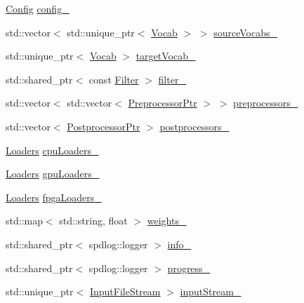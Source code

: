 \begin{DoxyCompactItemize}
\item 
\hyperlink{classamunmt_1_1Config}{Config} \hyperlink{classamunmt_1_1God_a5a0f3720bd8f1f19b7e50206e123f0e9}{config\+\_\+}
\item 
std\+::vector$<$ std\+::unique\+\_\+ptr$<$ \hyperlink{classamunmt_1_1Vocab}{Vocab} $>$ $>$ \hyperlink{classamunmt_1_1God_acb283c7cf822e3efed96a938695c1ac0}{source\+Vocabs\+\_\+}
\item 
std\+::unique\+\_\+ptr$<$ \hyperlink{classamunmt_1_1Vocab}{Vocab} $>$ \hyperlink{classamunmt_1_1God_a38957553a6fc282c0487c4d2d9a02f90}{target\+Vocab\+\_\+}
\item 
std\+::shared\+\_\+ptr$<$ const \hyperlink{classamunmt_1_1Filter}{Filter} $>$ \hyperlink{classamunmt_1_1God_aae4d25701c8177302ea6f07daff690c5}{filter\+\_\+}
\item 
std\+::vector$<$ std\+::vector$<$ \hyperlink{namespaceamunmt_a01f8e038a68167c344d9e40146064712}{Preprocessor\+Ptr} $>$ $>$ \hyperlink{classamunmt_1_1God_a609e290d29732005f6ce09a1e8c3a698}{preprocessors\+\_\+}
\item 
std\+::vector$<$ \hyperlink{namespaceamunmt_a93da118427da6be237f0407643816798}{Postprocessor\+Ptr} $>$ \hyperlink{classamunmt_1_1God_aef3af265dadb03728481dda039df6e26}{postprocessors\+\_\+}
\item 
\hyperlink{classamunmt_1_1God_abe005048d71d1ac78750395d4ac8a531}{Loaders} \hyperlink{classamunmt_1_1God_aa18f86519617baf112214a7564a7bae0}{cpu\+Loaders\+\_\+}
\item 
\hyperlink{classamunmt_1_1God_abe005048d71d1ac78750395d4ac8a531}{Loaders} \hyperlink{classamunmt_1_1God_a2a713e550f5ee7296e7a66bd0b98339d}{gpu\+Loaders\+\_\+}
\item 
\hyperlink{classamunmt_1_1God_abe005048d71d1ac78750395d4ac8a531}{Loaders} \hyperlink{classamunmt_1_1God_a59b113c68d8b05dfd18b8a48ed9fa180}{fpga\+Loaders\+\_\+}
\item 
std\+::map$<$ std\+::string, float $>$ \hyperlink{classamunmt_1_1God_a45d56b77d799c8c15e0f2af351fdf212}{weights\+\_\+}
\item 
std\+::shared\+\_\+ptr$<$ spdlog\+::logger $>$ \hyperlink{classamunmt_1_1God_a7df10015474c9e2f00b104f23615c661}{info\+\_\+}
\item 
std\+::shared\+\_\+ptr$<$ spdlog\+::logger $>$ \hyperlink{classamunmt_1_1God_a873205411a78432714ad191989c78367}{progress\+\_\+}
\item 
std\+::unique\+\_\+ptr$<$ \hyperlink{classamunmt_1_1InputFileStream}{Input\+File\+Stream} $>$ \hyperlink{classamunmt_1_1God_ad61c0588d0ce38a334d220337e5185d3}{input\+Stream\+\_\+}

\end{DoxyCompactItemize}
